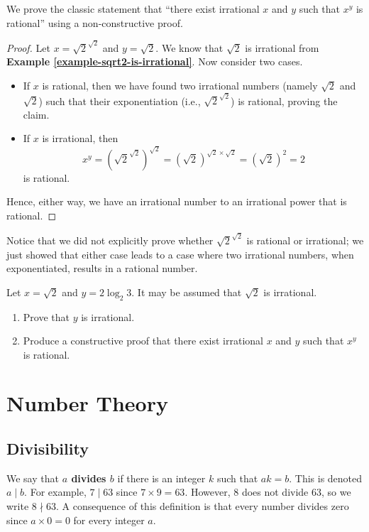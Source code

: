 \begin{example}
    We prove the classic statement that ``there exist irrational $x$ and $y$ such that $x^y$ is rational'' using a non-constructive proof.
    \begin{proof}
        Let $x = \sqrt2^{\sqrt2}$ and $y = \sqrt2$. We know that $\sqrt2$ is irrational from \textbf{Example \ref{example-sqrt2-is-irrational}}. Now consider two cases.
        \begin{itemize}
            \item If $x$ is rational, then we have found two irrational numbers (namely $\sqrt 2$ and $\sqrt 2$) such that their exponentiation (i.e.,  $\sqrt2^{\sqrt2}$) is rational, proving the claim.
            \item If $x$ is irrational, then \[x^y = \left(\sqrt2^{\sqrt2}\right)^{\sqrt2} = (\sqrt2)^{\sqrt2 \times \sqrt2} = (\sqrt2)^2 = 2\]
            is rational.
        \end{itemize}
        Hence, either way, we have an irrational number to an irrational power that is rational.
    \end{proof}
    Notice that we did not explicitly prove whether $\sqrt2^{\sqrt2}$ is rational or irrational; we just showed that either case leads to a case where two irrational numbers, when exponentiated, results in a rational number.
\end{example}

\begin{exercise}
    Let $x = \sqrt2$ and $y = 2\log_2{3}$. It may be assumed that $\sqrt2$ is irrational.
    \begin{enumerate}[label=(\roman*)]
        \item Prove that $y$ is irrational.
        \item Produce a constructive proof that there exist irrational $x$ and $y$ such that $x^y$ is rational.
    \end{enumerate}
\end{exercise}

\chapter{Number Theory}
\section{Divisibility}
We say that \textbf{$a$ divides $b$} if there is an integer $k$ such that $ak = b$. This is denoted $a\;|\;b$. For example, $7\;|\;63$ since $7 \times 9 = 63$. However, 8 does not divide 63, so we write $8 \nmid 63$. A consequence of this definition is that every number divides zero since $a \times 0 = 0$ for every integer $a$.

